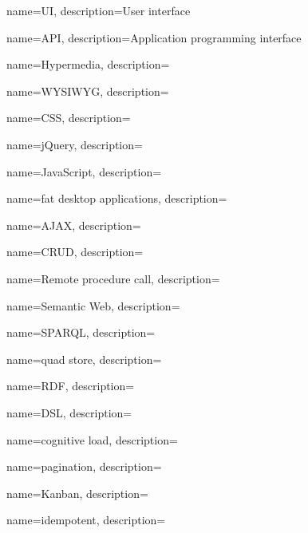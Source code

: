 {
    name={UI},
    description={User interface}
}

{
    name={API},
    description={Application programming interface}
}

{
    name={Hypermedia},
    description={}
}

{
    name={WYSIWYG},
    description={}
}

{
    name={CSS},
    description={}
}

{
    name={jQuery},
    description={}
}

{
    name={JavaScript},
    description={}
}

{
    name={fat desktop applications},
    description={}
}

{
    name={AJAX},
    description={}
}

{
    name={CRUD},
    description={}
}

{
    name={Remote procedure call},
    description={}
}

{
    name={Semantic Web},
    description={}
}

{
    name={SPARQL},
    description={}
}

{
    name={quad store},
    description={}
}

{
    name={RDF},
    description={}
}

{
    name={DSL},
    description={}
}

{
    name={cognitive load},
    description={}
}

{
    name={pagination},
    description={}
}

{
    name={Kanban},
    description={}
}

{
    name={idempotent},
    description={}
}
